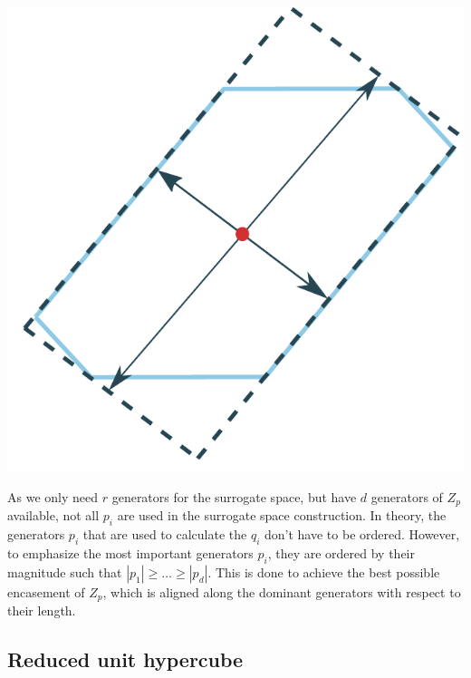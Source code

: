 \documentclass[
  a4paper,  %
  twoside,  %
  bibliography=totoc,
  headsepline,
  cleardoublepage=empty,
  parskip=half,
  draft=false
]{scrbook}
\begin{document}
\begin{mdframed}[style=style]
        \centering
\begin{minipage}{.49\textwidth}
        \centering
  \label{fig:surrogate_space}
    \end{minipage}%
    \begin{minipage}{0.49\textwidth}
        \centering
        \vspace{3.5mm}
  \includegraphics[width=0.8\linewidth]{graphics/surrogate_space}
  \hspace{-5.5mm}
    \end{minipage}
\end{mdframed}
%
As we only need $r$ generators for the surrogate space, but have $d$ generators of $Z_p$ available, not all $p_i$ are used in the surrogate space construction.
In theory, the generators $p_i$ that are used to calculate the $q_i$ don't have to be ordered.
However, to emphasize the most important generators $p_i$, they are ordered by their magnitude such that $|p_1|\geq \dots \geq |p_d|$.
This is done to achieve the best possible encasement of $Z_p$, which is aligned along the dominant generators with respect to their length.

\subsection{Reduced unit hypercube}
\label{sec:ruh}
\end{document}
